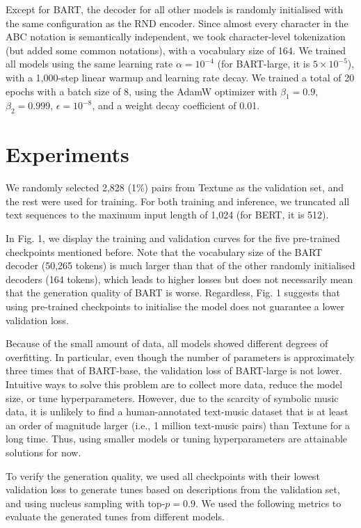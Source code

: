 \documentclass[letterpaper]{article} %
\begin{document}
Except for BART, the decoder for all other models is randomly initialised with the same configuration as the RND encoder. Since almost every character in the ABC notation is semantically independent, we took character-level tokenization (but added some common notations), with a vocabulary size of 164. We trained all models using the same learning rate $\alpha=10^{-4}$ (for BART-large, it is $5\times10^{-5}$), with a 1,000-step linear warmup and learning rate decay. We trained a total of 20 epochs with a batch size of 8, using the AdamW optimizer with $\beta_{1}=0.9$, $\beta_{2}=0.999$, $\epsilon=10^{-8}$, and a weight decay coefficient of 0.01.

\section{Experiments}
We randomly selected 2,828 (1\%) pairs from Textune as the validation set, and the rest were used for training. For both training and inference, we truncated all text sequences to the maximum input length of 1,024 (for BERT, it is 512).

In Fig. 1, we display the training and validation curves for the five pre-trained checkpoints mentioned before. Note that the vocabulary size of the BART decoder (50,265 tokens) is much larger than that of the other randomly initialised decoders (164 tokens), which leads to higher losses but does not necessarily mean that the generation quality of BART is worse. Regardless, Fig. 1 suggests that using pre-trained checkpoints to initialise the model does not guarantee a lower validation loss.

Because of the small amount of data, all models showed different degrees of overfitting. In particular, even though the number of parameters is approximately three times that of BART-base, the validation loss of BART-large is not lower. Intuitive ways to solve this problem are to collect more data, reduce the model size, or tune hyperparameters. However, due to the scarcity of symbolic music data, it is unlikely to find a human-annotated text-music dataset that is at least an order of magnitude larger (i.e., 1 million text-music pairs) than Textune for a long time. Thus, using smaller models or tuning hyperparameters are attainable solutions for now.

To verify the generation quality, we used all checkpoints with their lowest validation loss to generate tunes based on descriptions from the validation set, and using nucleus sampling with top-$p=0.9$. We used the following metrics to evaluate the generated tunes from different models.
\end{document}
